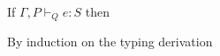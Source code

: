 \begin{theorem}
If $\Gamma, P \vdash_Q e : S$ then 
\end{theorem}

\begin{proofIdea}
By induction on the typing derivation
\end{proofIdea}